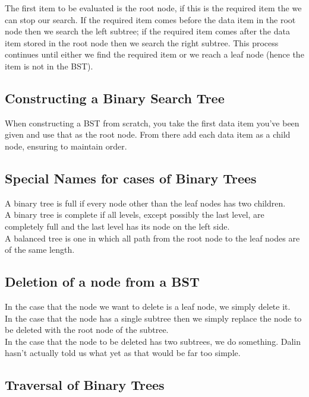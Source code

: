 The first item to be evaluated is the root node, if this is the required item the we can stop our search. If the required item comes before the data item in the root node then we search the left subtree; if the required item comes after the data item stored in the root node then we search the right subtree. This process continues until either we find the required item or we reach a leaf node (hence the item is not in the BST).

\subsection{Constructing a Binary Search Tree}
When constructing a BST from scratch, you take the first data item you've been given and use that as the root node. From there add each data item as a child node, ensuring to maintain order.

\subsection{Special Names for cases of Binary Trees}
A binary tree is full if every node other than the leaf nodes has two children.\\

A binary tree is complete if all levels, except possibly the last level, are completely full and the last level has its node on the left side. \\

A balanced tree is one in which all path from the root node to the leaf nodes are of the same length.

\subsection{Deletion of a node from a BST}
In the case that the node we want to delete is a leaf node, we simply delete it.\\

In the case that the node has a single subtree then we simply replace the node to be deleted with the root node of the subtree.\\

In the case that the node to be deleted has two subtrees, we do something. Dalin hasn't actually told us what yet as that would be far too simple. 

\subsection{Traversal of Binary Trees}


